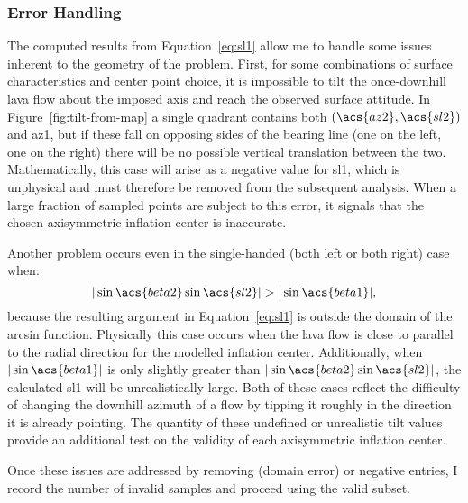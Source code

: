 \subsubsection{Error Handling}
The computed results from Equation~\eqref{eq:sl1} allow me to handle some issues inherent to the geometry of the problem. First, for some combinations of surface characteristics and center point choice, it is impossible to tilt the once-downhill lava flow about the imposed axis and reach the observed surface attitude. In Figure~\ref{fig:tilt-from-map} a single quadrant contains both $\left(\acs{az2},\acs{sl2}\right)$ and \acs{az1}, but if these fall on opposing sides of the \acs{bearing} line (one on the left, one on the right) there will be no possible vertical translation between the two. Mathematically, this case will arise as a negative value for \acs{sl1}, which is unphysical and must therefore be removed from the subsequent analysis. When a large fraction of sampled points are subject to this error, it signals that the chosen axisymmetric inflation center is inaccurate.

Another problem occurs even in the single-handed (both left or both right) case when:
\begin{equation}
     |\sin\acs{beta2}\sin\acs{sl2}| > |\sin\acs{beta1}|,\label{eq:domain-error}
\end{equation}
because the resulting argument in Equation~\eqref{eq:sl1} is outside the domain of the arcsin function. Physically this case occurs when the lava flow is close to parallel to the radial direction for the modelled inflation center. Additionally, when $|\sin\acs{beta1}|$ is only slightly greater than $|\sin\acs{beta2}\sin\acs{sl2}|$, the calculated \acs{sl1} will be unrealistically large. Both of these cases reflect the difficulty of changing the downhill azimuth of a flow by tipping it roughly in the direction it is already pointing. The quantity of these undefined or unrealistic tilt values provide an additional test on the validity of each axisymmetric inflation center.

Once these issues are addressed by removing  (domain error) or negative entries, I record the number of invalid samples and proceed using the valid subset.

